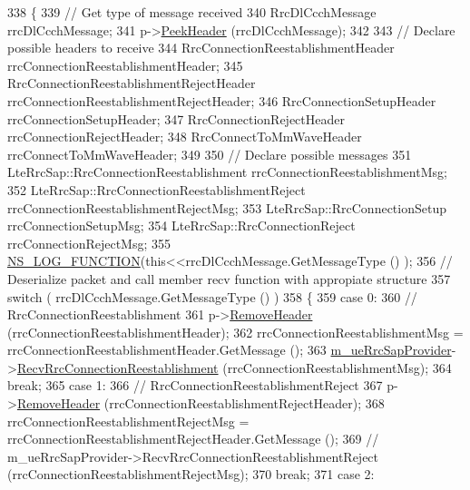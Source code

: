 \begin{DoxyCode}
338 \{
339   \textcolor{comment}{// Get type of message received}
340   RrcDlCcchMessage rrcDlCcchMessage;
341   p->\hyperlink{classns3_1_1Packet_aadc63487bea70945c418f4c3e9b81964}{PeekHeader} (rrcDlCcchMessage);
342 
343   \textcolor{comment}{// Declare possible headers to receive}
344   RrcConnectionReestablishmentHeader rrcConnectionReestablishmentHeader;
345   RrcConnectionReestablishmentRejectHeader rrcConnectionReestablishmentRejectHeader;
346   RrcConnectionSetupHeader rrcConnectionSetupHeader;
347   RrcConnectionRejectHeader rrcConnectionRejectHeader;
348   RrcConnectToMmWaveHeader rrcConnectToMmWaveHeader;
349 
350   \textcolor{comment}{// Declare possible messages}
351   LteRrcSap::RrcConnectionReestablishment rrcConnectionReestablishmentMsg;
352   LteRrcSap::RrcConnectionReestablishmentReject rrcConnectionReestablishmentRejectMsg;
353   LteRrcSap::RrcConnectionSetup rrcConnectionSetupMsg;
354   LteRrcSap::RrcConnectionReject rrcConnectionRejectMsg;
355  \hyperlink{log-macros-disabled_8h_a90b90d5bad1f39cb1b64923ea94c0761}{NS\_LOG\_FUNCTION}(\textcolor{keyword}{this}<<rrcDlCcchMessage.GetMessageType () );
356   \textcolor{comment}{// Deserialize packet and call member recv function with appropiate structure}
357   \textcolor{keywordflow}{switch} ( rrcDlCcchMessage.GetMessageType () )
358     \{
359     \textcolor{keywordflow}{case} 0:
360       \textcolor{comment}{// RrcConnectionReestablishment}
361       p->\hyperlink{classns3_1_1Packet_a0961eccf975d75f902d40956c93ba63e}{RemoveHeader} (rrcConnectionReestablishmentHeader);
362       rrcConnectionReestablishmentMsg = rrcConnectionReestablishmentHeader.GetMessage ();
363       \hyperlink{classns3_1_1MmWaveLteUeRrcProtocolReal_ae4324a866bc59d059e7938a12244eb1f}{m\_ueRrcSapProvider}->\hyperlink{classns3_1_1LteUeRrcSapProvider_ad9a7cb57c2dda4aade5d2a6a1f36c414}{RecvRrcConnectionReestablishment}
       (rrcConnectionReestablishmentMsg);
364       \textcolor{keywordflow}{break};
365     \textcolor{keywordflow}{case} 1:
366       \textcolor{comment}{// RrcConnectionReestablishmentReject}
367       p->\hyperlink{classns3_1_1Packet_a0961eccf975d75f902d40956c93ba63e}{RemoveHeader} (rrcConnectionReestablishmentRejectHeader);
368       rrcConnectionReestablishmentRejectMsg = rrcConnectionReestablishmentRejectHeader.GetMessage ();
369       \textcolor{comment}{// m\_ueRrcSapProvider->RecvRrcConnectionReestablishmentReject
       (rrcConnectionReestablishmentRejectMsg);}
370       \textcolor{keywordflow}{break};
371     \textcolor{keywordflow}{case} 2:

\end{DoxyCode}
